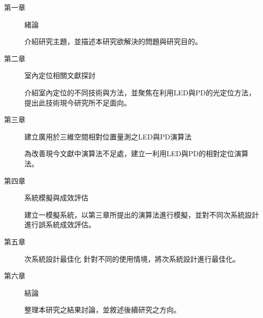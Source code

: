 \begin{description}
    \item[第一章] 緒論
    
    介紹研究主題，並描述本研究欲解決的問題與研究目的。
    
    \item[第二章] 室內定位相關文獻探討
    
    介紹室內定位的不同技術與方法，並聚焦在利用LED與PD的光定位方法，提出此技術現今研究所不足面向。
    
    \item[第三章] 建立廣用於三維空間相對位置量測之LED與PD演算法
    
    為改善現今文獻中演算法不足處，建立一利用LED與PD的相對定位演算法。

    \item[第四章] 系統模擬與成效評估
    
    建立一模擬系統，以第三章所提出的演算法進行模擬，並對不同次系統設計進行誤系統成效評估。
    
    \item[第五章] 次系統設計最佳化
    針對不同的使用情境，將次系統設計進行最佳化。
    
    \item[第六章] 結論
    
    整理本研究之結果討論，並敘述後續研究之方向。
    
    \end{description}







